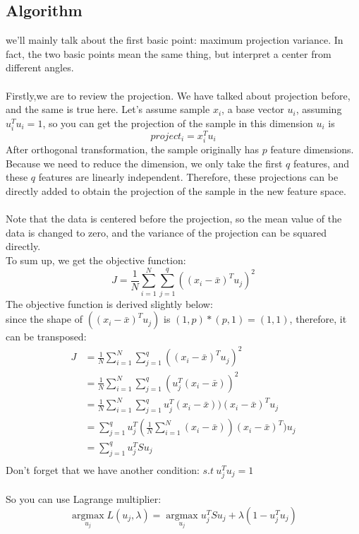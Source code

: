 \documentclass{report}
\begin{document}
\subsection{Algorithm}
we'll mainly talk about the first basic point: maximum projection variance. In fact, the two basic points mean the same thing, but interpret a center from different angles.\\\\
Firstly,we are to review the projection. We have talked about projection before, and the same is true here. Let's assume sample $x_ i $, a base vector $u_ i $, assuming $u_ i^Tu_ i = 1 $, so you can get the projection of the sample in  this dimension $u_ i $ is
$$
project_i=x_i^Tu_i
$$
After orthogonal transformation, the sample originally has $p $ feature dimensions. Because we need to reduce the dimension, we only take the first $q $ features, and these $q $ features are linearly independent. Therefore, these projections can be directly added to obtain the projection of the sample in the new feature space.\\\\
Note that the data is centered before the projection, so the mean value of the data is changed to zero, and the variance of the projection can be squared directly.\\
To sum up, we get the objective function:
$$
J=\frac{1}{N} \sum_{i=1}^{N} \sum_{j=1}^{q}\left(\left(x_{i}-\bar{x}\right)^{T} u_{j}\right)^{2}
$$
The objective function is derived slightly below:\\
since the shape of $((x_i-\bar{x})^Tu_j)$ is $(1,p)* (p,1)=(1,1)$, therefore, it can be transposed:
$$
\begin{aligned}
J&=\frac{1}{N} \sum_{i=1}^{N} \sum_{j=1}^{q}\left(\left(x_{i}-\bar{x}\right)^{T} u_{j}\right)^{2}\\
&=\frac{1}{N} \sum_{i=1}^{N} \sum_{j=1}^{q}(u_{j}^T(x_{i}-\bar{x}))^{2}\\
&=\frac{1}{N} \sum_{i=1}^{N} \sum_{j=1}^{q}u_{j}^T(x_{i}-\bar{x}))(x_{i}-\bar{x})^T u_j\\
&=\sum_{j=1}^{q} u_{j}^T(\frac{1}{N} \sum_{i=1}^{N} (x_{i}-\bar{x}))(x_{i}-\bar{x})^T) u_j\\
&=\sum_{j=1}^q u_j^T S u_j\\
\end{aligned}
$$
Don't forget that we have another condition: $s.t\ u_j^T u_j=1$\\\\
So you can use Lagrange multiplier:
$$
\underset{u_{j}}{\operatorname{argmax}} L\left(u_{j}, \lambda\right)=\underset{u_{j}}{\operatorname{argmax}} u_{j}^{T} S u_{j}+\lambda\left(1-u_{j}^{T} u_{j}\right)
$$
\end{document}
